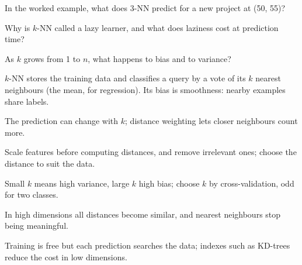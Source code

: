 \begin{checkpoint}
\begin{tightnum}
  \item In the worked example, what does 3-NN predict for a new project at
        (50, 55)?
  \item Why is $k$-NN called a lazy learner, and what does laziness cost at
        prediction time?
  \item As $k$ grows from 1 to $n$, what happens to bias and to variance?
\end{tightnum}
\end{checkpoint}

\begin{chaptersummary}
\begin{tight}
  \item $k$-NN stores the training data and classifies a query by a vote of its
        $k$ nearest neighbours (the mean, for regression). Its bias is
        smoothness: nearby examples share labels.
  \item The prediction can change with $k$; distance weighting lets closer
        neighbours count more.
  \item Scale features before computing distances, and remove irrelevant ones;
        choose the distance to suit the data.
  \item Small $k$ means high variance, large $k$ high bias; choose $k$ by
        cross-validation, odd for two classes.
  \item In high dimensions all distances become similar, and nearest neighbours
        stop being meaningful.
  \item Training is free but each prediction searches the data; indexes such as
        KD-trees reduce the cost in low dimensions.
\end{tight}
\end{chaptersummary}


